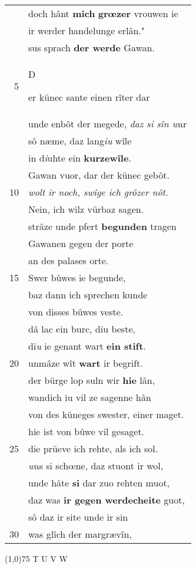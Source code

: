 \documentclass[8pt,a4paper,notitlepage]{article}
\begin{document}
\begin{table}[ht]
\begin{minipage}[t]{0.5\linewidth}
\begin{tabular}{rl}
 & doch hânt \textbf{mich} \textbf{grœzer} vrouwen ie\\ 
 & ir werder handelunge erlân."\\ 
 & sus sprach \textbf{der werde} Gawan.\\ 
5 & \begin{large}D\end{large}er künec sante einen rîter dar\\ 
 & unde enbôt der megede, \textit{daz si sîn w}ar\\ 
 & sô næme, daz lang\textit{iu} wîle\\ 
 & in d\textit{i}uhte ein \textbf{kurzewîle}.\\ 
 & Gawan vuor, dar der künec gebôt.\\ 
10 & \textit{wolt ir noch, swîge ich grôzer nôt.}\\ 
 & Nein, ich wilz vürbaz sagen.\\ 
 & strâze unde pfert \textbf{begunden} tragen\\ 
 & Gawanen gegen der porte\\ 
 & an des palases orte.\\ 
15 & Swer bûwes ie begunde,\\ 
 & baz dann ich sprechen kunde\\ 
 & von disses bûwes veste.\\ 
 & dâ lac ein burc, diu beste,\\ 
 & di\textit{u} ie genant wart \textbf{ein stift}.\\ 
20 & unmâze wît \textbf{wart} ir begrift.\\ 
 & der bürge lop suln wir \textbf{hie} lân,\\ 
 & wandich iu vil ze sagenne hân\\ 
 & von des küneges swester, einer maget.\\ 
 & hie ist von bûwe vil gesaget.\\ 
25 & die prüeve ich rehte, als ich sol.\\ 
 & \textit{w}as si schœne, daz stuont ir wol,\\ 
 & unde hâte \textbf{si} dar zuo rehten muot,\\ 
 & daz was \textbf{ir gegen werdecheite} guot,\\ 
 & sô daz ir site unde ir sin\\ 
30 & was glîch der margrævîn,\\ 
\end{tabular}
\scriptsize
\line(1,0){75} \newline
T U V W \newline

\end{minipage}
\end{table}
\end{document}
